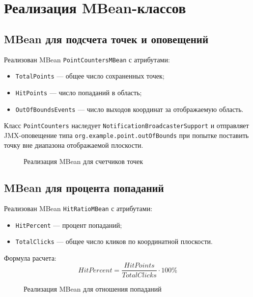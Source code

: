 \documentclass[12pt,a4paper]{article}
\begin{document}
\section{Реализация MBean-классов}

\subsection{MBean для подсчета точек и оповещений}
Реализован MBean \texttt{PointCountersMBean} с атрибутами:
\begin{itemize}
    \item \texttt{TotalPoints} --- общее число сохраненных точек;
    \item \texttt{HitPoints} --- число попаданий в область;
    \item \texttt{OutOfBoundsEvents} --- число выходов координат за отображаемую область.
\end{itemize}

Класс \texttt{PointCounters} наследует \texttt{NotificationBroadcasterSupport} и отправляет JMX-оповещение
типа \texttt{org.example.point.outOfBounds} при попытке поставить точку вне диапазона
отображаемой плоскости.

\begin{figure}[h]
\centering
{}
\caption{Реализация MBean для счетчиков точек}
\end{figure}

\subsection{MBean для процента попаданий}
Реализован MBean \texttt{HitRatioMBean} с атрибутами:
\begin{itemize}
    \item \texttt{HitPercent} --- процент попаданий;
    \item \texttt{TotalClicks} --- общее число кликов по координатной плоскости.
\end{itemize}

Формула расчета:
\[
HitPercent = \frac{HitPoints}{TotalClicks} \cdot 100\%
\]

\begin{figure}[h]
\centering
{}
\caption{Реализация MBean для отношения попаданий}
\end{figure}
\end{document}
